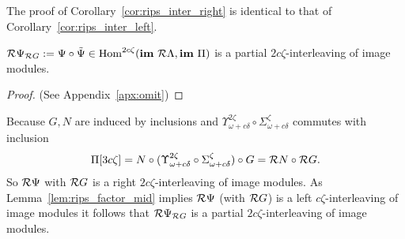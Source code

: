 The proof of Corollary~\ref{cor:rips_inter_right} is identical to that of Corollary~\ref{cor:rips_inter_left}.

\begin{corollary}\label{cor:rips_inter_right}
  $\mathcal{R} \Psi_{\mathcal{R} G} := \Psi\circ\tilde{\Psi}\in\mathrm{Hom}^{2c\zeta}(\mathbf{im}~\mathcal{R}\Lambda, \mathbf{im}~\Pi)$ is a partial $2c\zeta$-interleaving of image modules.
\end{corollary}\begin{proof}
  (See Appendix~\ref{apx:omit})
\end{proof}
\proofatend
  Because $G,N$ are induced by inclusions and $\Upsilon_{\omega+c\delta}^{2\zeta}\circ \Sigma_{\omega+c\delta}^{\zeta}$ commutes with inclusion
  \[\Pi[3c\zeta] = N\circ (\Upsilon_{\omega+c\delta}^{2\zeta}\circ \Sigma_{\omega+c\delta}^{\zeta})\circ G = \mathcal{R} N\circ \mathcal{R} G.\]
  So $\mathcal{R}\Psi$ with $\mathcal{R} G$ is a right $2c\zeta$-interleaving of image modules.
  As Lemma~\ref{lem:rips_factor_mid} implies $\mathcal{R} \Psi$ (with $\mathcal{R} G$) is a left $c\zeta$-interleaving of image modules it follows that $\mathcal{R} \Psi_{\mathcal{R} G}$ is a partial $2c\zeta$-interleaving of image modules.
\endproofatend

